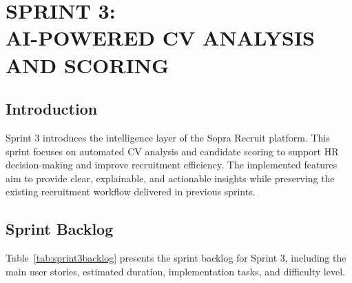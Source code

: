 ﻿\chapter[SPRINT 3: AI-POWERED CV ANALYSIS AND SCORING]{SPRINT 3:\\ AI-POWERED CV ANALYSIS AND SCORING}
\thispagestyle{MyStyle}
\minitoc
\newpage
\thispagestyle{MyStyle}

\section*{Introduction}

Sprint 3 introduces the intelligence layer of the Sopra Recruit platform. This sprint focuses on automated CV analysis and candidate scoring to support HR decision-making and improve recruitment efficiency. The implemented features aim to provide clear, explainable, and actionable insights while preserving the existing recruitment workflow delivered in previous sprints.

\section{Sprint Backlog}

Table~\ref{tab:sprint3backlog} presents the sprint backlog for Sprint 3, including the main user stories, estimated duration, implementation tasks, and difficulty level.

